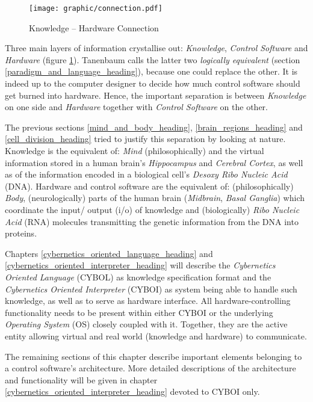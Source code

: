 \begin{figure}[ht]
    \begin{center}
        \texttt{[image: graphic/connection.pdf]}
        \caption{Knowledge -- Hardware Connection}
        \label{connection_figure}
    \end{center}
\end{figure}

Three main layers of information crystallise out: \emph{Knowledge},
\emph{Control Software} and \emph{Hardware} (figure \ref{connection_figure}).
Tanenbaum \cite{tanenbaum1999} calls the latter two \textit{logically equivalent}
(section \ref{paradigm_and_language_heading}), because one could replace the
other. It is indeed up to the computer designer to decide how much control
software should get burned into hardware. Hence, the important separation is
between \emph{Knowledge} on one side and \emph{Hardware} together with
\emph{Control Software} on the other.

The previous sections \ref{mind_and_body_heading}, \ref{brain_regions_heading}
and \ref{cell_division_heading} tried to justify this separation by looking at
nature. Knowledge is the equivalent of: \emph{Mind} (philosophically) and the
virtual information stored in a human brain's \emph{Hippocampus} and
\emph{Cerebral Cortex}, as well as of the information encoded in a biological
cell's \emph{Desoxy Ribo Nucleic Acid} (DNA). Hardware and control software are
the equivalent of: (philosophically) \emph{Body}, (neurologically) parts of the
human brain (\emph{Midbrain}, \emph{Basal Ganglia}) which coordinate the input/
output (i/o) of knowledge and (biologically) \emph{Ribo Nucleic Acid} (RNA)
molecules transmitting the genetic information from the DNA into proteins.

Chapters \ref{cybernetics_oriented_language_heading} and
\ref{cybernetics_oriented_interpreter_heading} will describe the
\emph{Cybernetics Oriented Language} (CYBOL) as knowledge specification format
and the \emph{Cybernetics Oriented Interpreter} (CYBOI) as system being able to
handle such knowledge, as well as to serve as hardware interface. All
hardware-controlling functionality needs to be present within either CYBOI or
the underlying \emph{Operating System} (OS) closely coupled with it. Together,
they are the active entity allowing virtual and real world (knowledge and
hardware) to communicate.

The remaining sections of this chapter describe important elements belonging to
a control software's architecture. More detailed descriptions of the
architecture and functionality will be given in chapter
\ref{cybernetics_oriented_interpreter_heading} devoted to CYBOI only.

